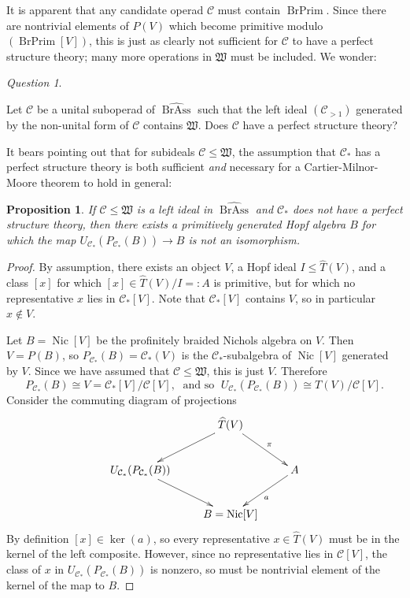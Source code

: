 \documentclass[12pt]{article}
\DeclareMathOperator{\Nic}{Nic}
\DeclareMathOperator{\BrAss}{BrAss}
\DeclareMathOperator{\BrPrim}{BrPrim}
\newcommand{\BrAsshat}{\widehat{\BrAss}} %
\newcommand{\That}{\widehat{T}}
\newcommand{\CC} {\mathcal{C}}
\newcommand{\mW}{\mathfrak{W}}
\theoremstyle{plain}
\newtheorem{prop}[thm]{Proposition}
\theoremstyle{definition}
\theoremstyle{remark}
\newtheorem{ques}[thm]{Question}
\begin{document}
It is apparent that any candidate operad $\CC$ must contain $\BrPrim$.  Since there are nontrivial elements of $P(V)$ which become primitive modulo $(\BrPrim[V])$, this is just as clearly not sufficient for $\CC$ to have a perfect structure theory; many more operations in $\mW$ must be included.  We wonder:

\begin{ques} \label{smaller_ques}

Let $\CC$ be a unital suboperad of $\BrAsshat$ such that the left ideal $(\CC_{>1})$ generated by the non-unital form of $\CC$ contains $\mW$.  Does $\CC$ have a perfect structure theory?

\end{ques}

It bears pointing out that for subideals $\CC \leq \mW$, the assumption that $\CC_*$ has a perfect structure theory is both sufficient \emph{and} necessary for a Cartier-Milnor-Moore theorem to hold in general:

\begin{prop}

If $\CC \leq \mW$ is a left ideal in $\BrAsshat$ and $\CC_*$ does not have a perfect structure theory, then there exists a primitively generated Hopf algebra $B$ for which the map $U_{\CC_*}(P_{\CC_*}(B)) \to B$ is not an isomorphism.

\end{prop}

\begin{proof}

By assumption, there exists an object $V$, a Hopf ideal $I \leq \That(V)$, and a class $[x]$ for which $[x] \in \That(V)/I =: A$ is primitive, but for which no representative $x$ lies in $\CC_*[V]$. Note that $\CC_*[V]$ contains $V$, so in particular $x \notin V$.  

Let $B = \Nic[V]$ be the profinitely braided Nichols algebra on $V$.  Then $V = P(B)$, so $P_{\CC_*}(B) = \CC_*(V)$ is the $\CC_*$-subalgebra of $\Nic[V]$ generated by $V$.  Since we have assumed that $\CC \leq \mW$, this is just $V$.  Therefore 
%
$$P_{\CC_*}(B) \cong V= \CC_*[V] / \CC[V], \; \mbox{ and so } \; U_{\CC_*}(P_{\CC_*}(B)) \cong T(V) / \CC[V].$$
%
Consider the commuting diagram of projections
%
$$\xymatrix{
 & \That(V) \ar[dl] \ar[dr]^-{\pi} & \\
U_{\CC_*}(P_{\CC_*}(B)) \ar[dr] & & A \ar[dl]^{a} \\
 & B= \Nic[V] &
}$$
%
By definition $[x] \in \ker(a)$, so every representative $x \in \That(V)$ must be in the kernel of the left composite.  However, since no representative lies in $\CC[V]$, the class of $x$ in $U_{\CC_*}(P_{\CC_*}(B))$ is nonzero, so must be nontrivial element of the kernel of the map to $B$. 

\end{proof}
\end{document}
